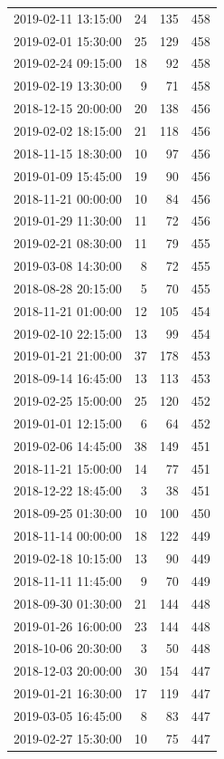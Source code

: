 \begin{tabular}{lrrr}
2019-02-11 13:15:00 & 24 & 135 & 458 \\
2019-02-01 15:30:00 & 25 & 129 & 458 \\
2019-02-24 09:15:00 & 18 & 92 & 458 \\
2019-02-19 13:30:00 & 9 & 71 & 458 \\
2018-12-15 20:00:00 & 20 & 138 & 456 \\
2019-02-02 18:15:00 & 21 & 118 & 456 \\
2018-11-15 18:30:00 & 10 & 97 & 456 \\
2019-01-09 15:45:00 & 19 & 90 & 456 \\
2018-11-21 00:00:00 & 10 & 84 & 456 \\
2019-01-29 11:30:00 & 11 & 72 & 456 \\
2019-02-21 08:30:00 & 11 & 79 & 455 \\
2019-03-08 14:30:00 & 8 & 72 & 455 \\
2018-08-28 20:15:00 & 5 & 70 & 455 \\
2018-11-21 01:00:00 & 12 & 105 & 454 \\
2019-02-10 22:15:00 & 13 & 99 & 454 \\
2019-01-21 21:00:00 & 37 & 178 & 453 \\
2018-09-14 16:45:00 & 13 & 113 & 453 \\
2019-02-25 15:00:00 & 25 & 120 & 452 \\
2019-01-01 12:15:00 & 6 & 64 & 452 \\
2019-02-06 14:45:00 & 38 & 149 & 451 \\
2018-11-21 15:00:00 & 14 & 77 & 451 \\
2018-12-22 18:45:00 & 3 & 38 & 451 \\
2018-09-25 01:30:00 & 10 & 100 & 450 \\
2018-11-14 00:00:00 & 18 & 122 & 449 \\
2019-02-18 10:15:00 & 13 & 90 & 449 \\
2018-11-11 11:45:00 & 9 & 70 & 449 \\
2018-09-30 01:30:00 & 21 & 144 & 448 \\
2019-01-26 16:00:00 & 23 & 144 & 448 \\
2018-10-06 20:30:00 & 3 & 50 & 448 \\
2018-12-03 20:00:00 & 30 & 154 & 447 \\
2019-01-21 16:30:00 & 17 & 119 & 447 \\
2019-03-05 16:45:00 & 8 & 83 & 447 \\
2019-02-27 15:30:00 & 10 & 75 & 447 \\

\end{tabular}
